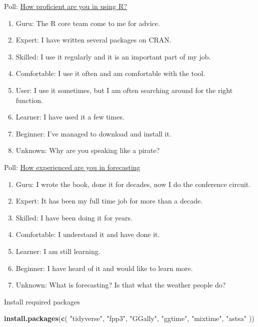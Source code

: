 \documentclass[
  14pt,
  ignorenonframetext,
  aspectratio=169,
]{beamer}
\newenvironment{Shaded}{\begin{snugshade}}{\end{snugshade}}
\newcommand{\FunctionTok}[1]{\textcolor[rgb]{0.13,0.29,0.53}{\textbf{#1}}}
\newcommand{\NormalTok}[1]{#1}
\newcommand{\StringTok}[1]{\textcolor[rgb]{0.31,0.60,0.02}{#1}}
\providecommand{\tightlist}{%
  \setlength{\itemsep}{0pt}\setlength{\parskip}{0pt}}
\renewenvironment{Shaded}{\vspace*{0.15cm}\color{black}\fontsize{10}{10}\sf\begin{snugshade}\color{black}}{\end{snugshade}}
\begin{document}
\begin{frame}{Poll: \href{https://www.menti.com/alfmobtvo9wb}{How
proficient are you in using R?}}
\protect{}\label{poll-how-proficient-are-you-in-using-r}
\fontsize{14}{15}\sf

\begin{enumerate}
\tightlist
\item
  Guru: The R core team come to me for advice.
\item
  Expert: I have written several packages on CRAN.
\item
  Skilled: I use it regularly and it is an important part of my job.
\item
  Comfortable: I use it often and am comfortable with the tool.
\item
  User: I use it sometimes, but I am often searching around for the
  right function.
\item
  Learner: I have used it a few times.
\item
  Beginner: I've managed to download and install it.
\item
  Unknown: Why are you speaking like a pirate?
\end{enumerate}
\end{frame}

\begin{frame}{Poll: \href{https://www.menti.com/alfmobtvo9wb}{How
experienced are you in forecasting}}
\protect{}\label{poll-how-experienced-are-you-in-forecasting}
\begin{enumerate}
\tightlist
\item
  Guru: I wrote the book, done it for decades, now I do the conference
  circuit.
\item
  Expert: It has been my full time job for more than a decade.
\item
  Skilled: I have been doing it for years.
\item
  Comfortable: I understand it and have done it.
\item
  Learner: I am still learning.
\item
  Beginner: I have heard of it and would like to learn more.
\item
  Unknown: What is forecasting? Is that what the weather people do?
\end{enumerate}
\end{frame}

\begin{frame}[fragile]{Install required packages}
\protect{}\label{install-required-packages}
\begin{Shaded}
\begin{Highlighting}[]
\FunctionTok{install.packages}\NormalTok{(}\FunctionTok{c}\NormalTok{(}
  \StringTok{"tidyverse"}\NormalTok{,}
  \StringTok{"fpp3"}\NormalTok{,}
  \StringTok{"GGally"}\NormalTok{,}
  \StringTok{"ggtime"}\NormalTok{,}
  \StringTok{"mixtime"}\NormalTok{,}
  \StringTok{"astsa"}
\NormalTok{))}
\end{Highlighting}
\end{Shaded}
\end{frame}
\end{document}
